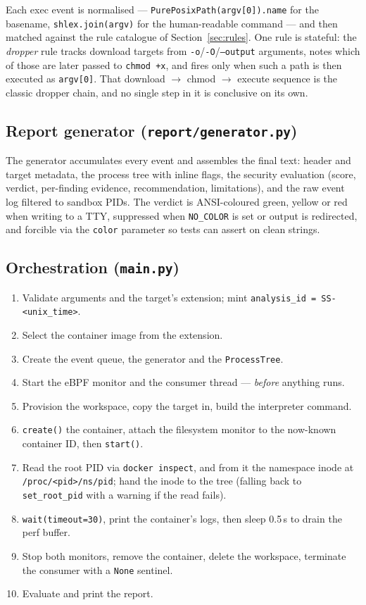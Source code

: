 \documentclass[11pt,a4paper]{article}
\newcommand{\code}[1]{\texttt{\small #1}}
\newcommand{\file}[1]{\texttt{\small #1}}
\begin{document}
Each exec event is normalised --- \code{PurePosixPath(argv[0]).name} for the
basename, \code{shlex.join(argv)} for the human-readable command --- and then
matched against the rule catalogue of Section~\ref{sec:rules}. One rule is stateful:
the \emph{dropper} rule tracks download targets from \code{-o}/\code{-O}/\code{--output}
arguments, notes which of those are later passed to \code{chmod +x}, and fires only
when such a path is then executed as \code{argv[0]}. That
download $\rightarrow$ chmod $\rightarrow$ execute sequence is the classic dropper
chain, and no single step in it is conclusive on its own.

\subsection{Report generator (\file{report/generator.py})}
The generator accumulates every event and assembles the final text: header and
target metadata, the process tree with inline flags, the security evaluation
(score, verdict, per-finding evidence, recommendation, limitations), and the raw
event log filtered to sandbox PIDs. The verdict is ANSI-coloured green, yellow or
red when writing to a TTY, suppressed when \code{NO\_COLOR} is set or output is
redirected, and forcible via the \code{color} parameter so tests can assert on clean
strings.

\subsection{Orchestration (\file{main.py})}
\begin{enumerate}[leftmargin=*,itemsep=1pt]
  \item Validate arguments and the target's extension; mint
        \code{analysis\_id = SS-<unix\_time>}.
  \item Select the container image from the extension.
  \item Create the event queue, the generator and the \code{ProcessTree}.
  \item Start the eBPF monitor and the consumer thread --- \emph{before} anything
        runs.
  \item Provision the workspace, copy the target in, build the interpreter command.
  \item \code{create()} the container, attach the filesystem monitor to the
        now-known container ID, then \code{start()}.
  \item Read the root PID via \code{docker inspect}, and from it the namespace inode
        at \file{/proc/<pid>/ns/pid}; hand the inode to the tree (falling back to
        \code{set\_root\_pid} with a warning if the read fails).
  \item \code{wait(timeout=30)}, print the container's logs, then sleep 0.5\,s to
        drain the perf buffer.
  \item Stop both monitors, remove the container, delete the workspace, terminate
        the consumer with a \code{None} sentinel.
  \item Evaluate and print the report.
\end{enumerate}
\end{document}
